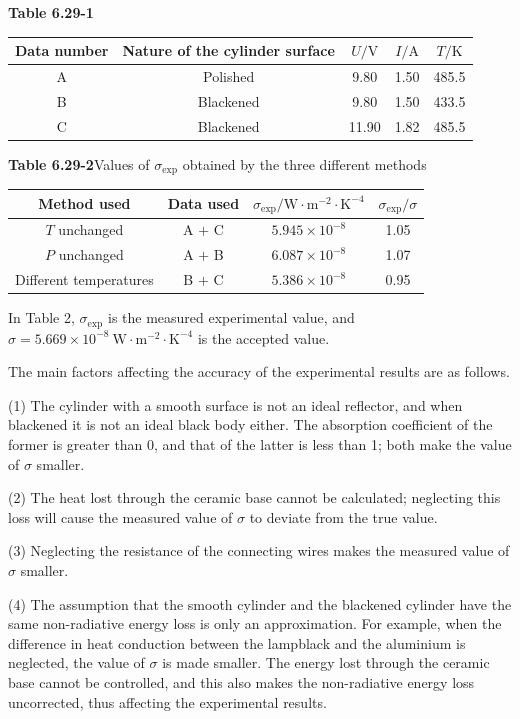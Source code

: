 \begin{center}
\textbf{Table 6.29-1}\\[3pt]
\begin{tabular}{ccccc}
\toprule
Data number & Nature of the cylinder surface & $U/\mathrm{V}$ & $I/\mathrm{A}$ & $T/\mathrm{K}$\\
\midrule
A & Polished & 9.80 & 1.50 & 485.5\\
B & Blackened & 9.80 & 1.50 & 433.5\\
C & Blackened & 11.90 & 1.82 & 485.5\\
\bottomrule
\end{tabular}
\end{center}

\begin{center}
\textbf{Table 6.29-2}\quad Values of $\sigma_{\exp}$ obtained by the three different methods\\[3pt]
\begin{tabular}{cccc}
\toprule
Method used & Data used & $\sigma_{\exp}/\mathrm{W\cdot m^{-2}\cdot K^{-4}}$ & $\sigma_{\exp}/\sigma$\\
\midrule
$T$ unchanged & A $+$ C & $5.945\times10^{-8}$ & 1.05\\
$P$ unchanged & A $+$ B & $6.087\times10^{-8}$ & 1.07\\
Different temperatures & B $+$ C & $5.386\times10^{-8}$ & 0.95\\
\bottomrule
\end{tabular}
\end{center}

\noindent In Table 2, $\sigma_{\exp}$ is the measured experimental value, and $\sigma=5.669\times10^{-8}\ \mathrm{W\cdot m^{-2}\cdot K^{-4}}$ is the accepted value.



The main factors affecting the accuracy of the experimental results are as follows.

(1) The cylinder with a smooth surface is not an ideal reflector, and when blackened it is not an ideal black body either. The absorption coefficient of the former is greater than 0, and that of the latter is less than 1; both make the value of $\sigma$ smaller.

(2) The heat lost through the ceramic base cannot be calculated; neglecting this loss will cause the measured value of $\sigma$ to deviate from the true value.

(3) Neglecting the resistance of the connecting wires makes the measured value of $\sigma$ smaller.

(4) The assumption that the smooth cylinder and the blackened cylinder have the same non-radiative energy loss is only an approximation. For example, when the difference in heat conduction between the lampblack and the aluminium is neglected, the value of $\sigma$ is made smaller. The energy lost through the ceramic base cannot be controlled, and this also makes the non-radiative energy loss uncorrected, thus affecting the experimental results.
